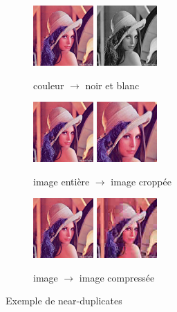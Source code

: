 \documentclass[utf8,final]{stageM2R} %
\begin{document}
\begin{center}
  \begin{figure}[H]
    \begin{subfigure}{.33\textwidth}
      \centering
      \includegraphics[width=23mm]{images/lena_base.jpg} \includegraphics[width=23mm]{images/lena_bw.jpg}
      \caption{couleur $\to$ noir et blanc}
      \label{lena-bw}
    \end{subfigure}
    \begin{subfigure}{.33\textwidth}
      \centering
      \includegraphics[width=23mm]{images/lena_base.jpg} \includegraphics[width=23mm]{images/lena_crop.jpg}
      \caption{image entière $\to$ image croppée}
      \label{lena-crop}
    \end{subfigure}
    \begin{subfigure}{.33\textwidth}
      \centering
      \includegraphics[width=23mm]{images/lena_base.jpg} \includegraphics[width=23mm]{images/lena_comp.jpg}
      \caption{image $\to$ image compressée}
      \label{lena-comp}
    \end{subfigure}
    \caption{Exemple de near-duplicates}
    \label{fig:near-duplicates-images}
  \end{figure}
\end{center}
\end{document}
